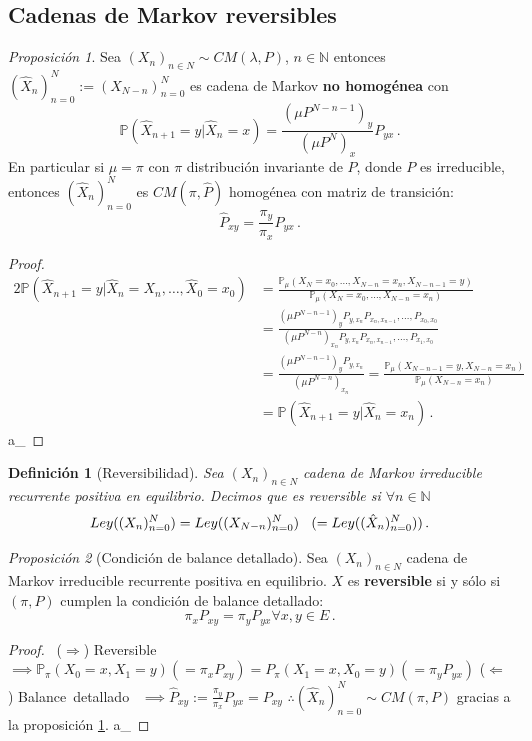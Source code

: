 \documentclass[letterpaper,11pt]{article} %
\def\espacio{\hspace{.25cm}\,}
\theoremstyle{defbreak}
\newtheorem{definition}{Definición}[subsection]
\theoremstyle{propbreak}
\theoremstyle{remark}
\theoremstyle{break}
\newtheorem{proposition}{Proposición}[subsection]
\def\P{\mathbb{P}}
\def\N{\mathbb{N}}
\def\gris{\color{mygray}}
\def\negro{\color{black}}
\def\findem{\null\hfill\color{white}a\color{black}_\square}
\def\xcm{(X_n)_{n\in N}}
\def\cm{CM(\lambda,P)}
\def\xhat{\hat{X}}
\begin{document}
\subsection{Cadenas de Markov reversibles} %
\begin{proposition}
\label{prop:4_1_1}
Sea $\xcm\sim\cm$, $n\in\N$ entonces $(\hat{X}_n)_{n=0}^N:=(X_{N-n})_{n=0}^N$ es cadena de Markov \textbf{no homogénea} con
$$ \P(\hat{X}_{n+1}=y|\hat{X}_n=x)=\displaystyle\frac{(\mu P^{N-n-1})_y}{(\mu P^N)_x}P_{yx} \, .$$
En particular si $\mu=\pi$ con $\pi$ distribución invariante de $P$, donde $P$ es irreducible, entonces $(\hat{X}_n)_{n=0}^N$ es $CM(\pi,\hat{P})$ homogénea con matriz de transición:
$$ \hat{P}_{xy}=\displaystyle\frac{\pi_y}{\pi_x}P_{yx} \, .$$
\end{proposition}
\begin{proof}
\gris
\begin{alignat*}{2}
    \P(\xhat_{n+1}=y|\xhat_{n}=X_n,\dots,\xhat_0=x_0) & = \displaystyle \frac{\P_\mu(X_N=x_0,\dots,X_{N-n}=x_n,X_{N-n-1}=y)}{\P_\mu(X_N=x_0,\dots,X_{N-n}=x_n)} \\
     & = \frac{(\mu P^{N-n-1})_yP_{y,x_n}P_{x_n,x_{n-1}},\dots,P_{x_0,x_0}}{(\mu P^{N-n})_{x_n}P_{y,x_n}P_{x_n,x_{n-1}},\dots,P_{x_1,x_0}} \\
     & =  \frac{(\mu P^{N-n-1})_yP_{y,x_n}}{(\mu P^{N-n})_{x_n}} = \frac{\P_\mu(X_{N-n-1}=y,X_{N-n}=x_n)}{\P_\mu(X_{N-n}=x_n)}\\
     & = \P(\hat{X}_{n+1}=y|\hat{X}_n=x_n) \, .
\end{alignat*}
\findem
\negro 
\end{proof}
\begin{definition}[Reversibilidad]
Sea $\xcm$ cadena de Markov irreducible recurrente positiva en equilibrio. Decimos que es reversible si $\forall n\in\N$
$$ Ley((X_n)_{n=0}^N)=Ley((X_{N-n})_{n=0}^N)\espacio(=Ley((\hat{X}_{n})_{n=0}^N)) \, .$$
\end{definition}
\begin{proposition}[Condición de balance detallado]
Sea $\xcm$ cadena de Markov irreducible recurrente positiva en equilibrio. $X$ es \textbf{reversible} si y sólo si $(\pi,P)$ cumplen la condición de balance detallado:
$$ \pi_xP_{xy}=\pi_yP_{yx}\forall x,y\in E\, .$$
\end{proposition}
\begin{proof}
\gris
\mbox{ }\newline ($\Rightarrow$) Reversible $\implies \P_\pi(X_0=x,X_1=y)(=\pi_xP_{xy})=P_\pi(X_1=x,X_0=y)(=\pi_yP_{yx})$
\newline ($\Leftarrow$) \mbox{Balance detallado } $\implies \hat{P}_{xy}:=\displaystyle\frac{\pi_y}{\pi_x}P_{yx}=P_{xy}$
\newline $\therefore (\hat{X}_n)_{n=0}^N\sim CM(\pi,P)$ gracias a la proposición \ref{prop:4_1_1}. \findem
\negro
\end{proof}
\end{document}
